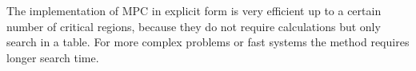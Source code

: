 The implementation of MPC in explicit form is very efficient up to a certain number of critical regions, because they do not require calculations but only search in a table. For more complex problems or fast systems the method requires longer search time.

%

